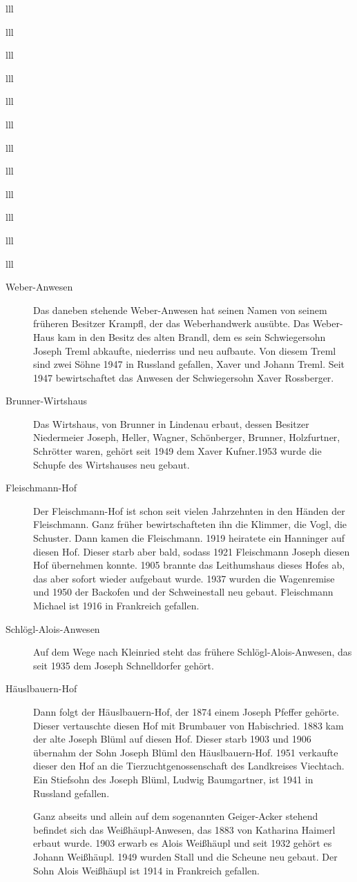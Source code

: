 \documentclass[12pt,a4pager]{book}
\begin{document}
\begin{tabuluar}{lll}
\begin{tabuluar}{lll}
\begin{tabuluar}{lll}
\begin{tabuluar}{lll}
\begin{tabuluar}{lll}
\begin{tabuluar}{lll}
\begin{tabuluar}{lll}
\begin{tabuluar}{lll}
\begin{tabuluar}{lll}
\begin{tabuluar}{lll}
\begin{tabuluar}{lll}
\begin{tabuluar}{lll}
\begin{description}
\item[Weber-Anwesen] Das daneben stehende Weber-Anwesen hat seinen Namen von
seinem früheren Besitzer Krampfl, der das Weberhandwerk ausübte. Das Weber-Haus
kam in den Besitz des alten Brandl, dem es sein Schwiegersohn Joseph Treml
abkaufte, niederriss und neu aufbaute. Von diesem Treml sind zwei Söhne 1947 in
Russland gefallen, Xaver und Johann Treml. Seit 1947 bewirtschaftet das Anwesen
der Schwiegersohn Xaver Rossberger.

\item[Brunner-Wirtshaus] Das Wirtshaus, von Brunner in Lindenau erbaut, dessen
Besitzer Niedermeier Joseph, Heller, Wagner, Schönberger, Brunner, Holzfurtner,
Schrötter waren, gehört seit 1949 dem Xaver Kufner.1953 wurde die Schupfe des
Wirtshauses neu gebaut.

\item[Fleischmann-Hof] Der Fleischmann-Hof ist schon seit vielen Jahrzehnten in
den Händen der Fleischmann. Ganz früher bewirtschafteten ihn die Klimmer, die
Vogl, die Schuster. Dann kamen die Fleischmann. 1919 heiratete ein Hanninger auf
diesen Hof. Dieser starb aber bald, sodass 1921 Fleischmann Joseph diesen Hof
übernehmen konnte. 1905 brannte das Leithumshaus dieses Hofes ab, das aber
sofort wieder aufgebaut wurde. 1937 wurden die Wagenremise und 1950 der Backofen
und der Schweinestall neu gebaut. Fleischmann Michael ist 1916 in Frankreich
gefallen.

\item[Schlögl-Alois-Anwesen] Auf dem Wege nach Kleinried steht das frühere
Schlögl-Alois-Anwesen, das seit 1935 dem Joseph Schnelldorfer gehört.

\item[Häuslbauern-Hof] Dann folgt der Häuslbauern-Hof, der 1874 einem Joseph
Pfeffer gehörte. Dieser vertauschte diesen Hof mit Brumbauer von Habischried.
1883 kam der alte Joseph Blüml auf diesen Hof. Dieser starb 1903 und 1906
übernahm der Sohn Joseph Blüml den Häuslbauern-Hof. 1951 verkaufte dieser den
Hof an die Tierzuchtgenossenschaft des Landkreises Viechtach. Ein Stiefsohn des
Joseph Blüml, Ludwig Baumgartner, ist 1941 in Russland gefallen.

Ganz abseits und allein auf dem sogenannten Geiger-Acker stehend befindet sich
das Weißhäupl-Anwesen, das 1883 von Katharina Haimerl erbaut wurde. 1903 erwarb
es Alois Weißhäupl und seit 1932 gehört es Johann Weißhäupl. 1949 wurden Stall
und die Scheune neu gebaut. Der Sohn Alois Weißhäupl ist 1914 in Frankreich
gefallen.


\end{description}
\end{tabuluar}
\end{tabuluar}
\end{tabuluar}
\end{tabuluar}
\end{tabuluar}
\end{tabuluar}
\end{tabuluar}
\end{tabuluar}
\end{tabuluar}
\end{tabuluar}
\end{tabuluar}
\end{tabuluar}
\end{document}
